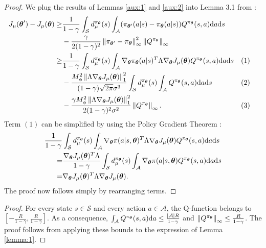 \firstlemma*
\begin{proof}
We plug the results of Lemmas \ref{aux:1} and \ref{aux:2} into Lemma 3.1 from \cite{NIPS2013_5186}:
\begin{align*}
J_{\mu}(\vtheta') - J_{\mu}(\vtheta) \geq  
	& \frac{1}{1-\gamma} \int_{\mathcal{S}}d_{\mu}^{\pi_{\vtheta}}(s)
	\int_{\mathcal{A}} (\pi_{\vtheta'}(a|s) - \pi_{\vtheta}(a|s))Q^{\pi_{\vtheta}}(s,a)\mathrm{d}a\mathrm{d}s \\
	& -\frac{\gamma}{2(1-\gamma)^2} \norm[\infty]{\pi_{\vtheta'}-\pi_{\vtheta}}^2 \norm[\infty]{Q^{\pi_{\vtheta}}} \\
	\geq & 
		\frac{1}{1-\gamma} \int_{\mathcal{S}}d_{\mu}^{\pi_{\vtheta}}(s)
		\int_{\mathcal{A}}
		\nabla_{\vtheta}\pi_{\vtheta}(a|s)^T\Lambda\gradJ{\vtheta}
		Q^{\pi_{\vtheta}}(s,a)\mathrm{d}a\mathrm{d}s && (1) \\
		& - \frac{M_{\phi}^2\norm[1]{\Lambda\gradJ{\vtheta}}^2}
		{(1-\gamma)\sqrt{2\pi}\sigma^3}
		\int_{\mathcal{S}}d_{\mu}^{\pi_{\vtheta}}(s)
		\int_{\mathcal{A}} 
		Q^{\pi_{\vtheta}}(s,a)\mathrm{d}a\mathrm{d}s && (2) \\ 
		&  -\frac{\gamma M_{\phi}^2\norm[1]{\Lambda\gradJ{\vtheta}}^2}
		{2(1-\gamma)^2\sigma^2}\norm[\infty]{Q^{\pi_{\vtheta}}}.	&& (3)
\end{align*}
Term $(1)$ can be simplified by using the Policy Gradient Theorem \cite{NIPS1999_1713}:
\begin{align*}
\frac{1}{1-\gamma} &  \int_{\mathcal{S}}d_{\mu}^{\pi_{\vtheta}}(s)
		\int_{\mathcal{A}}
		\nabla_{\vtheta}\pi(a|s,\vtheta)^T\Lambda\gradJ{\vtheta}
		Q^{\pi_{\vtheta}}(s,a)\mathrm{d}a\mathrm{d}s \\
		= & \frac{\gradJ{\vtheta}^T\Lambda}{1-\gamma}
		\int_{\mathcal{S}}d_{\mu}^{\pi_{\vtheta}}(s)
		\int_{\mathcal{A}}
		\nabla_{\vtheta}\pi(a|s,\vtheta)Q^{\pi_{\vtheta}}(s,a)\mathrm{d}a\mathrm{d}s \\
		= & \gradJ{\vtheta}^T\Lambda\gradJ{\vtheta}.
\end{align*}
The proof now follows simply by rearranging terms.
\end{proof}


\firsttheorem*
\begin{proof}
For every state $s \in \mathcal{S}$ and every action $a \in \mathcal{A}$, the Q-function belongs to $\left[-\frac{R}{1-\gamma},\frac{R}{1-\gamma}\right]$. As a consequence, $\int_{\mathcal{A}}Q^{\pi_{\vtheta}}(s,a)\mathrm{d}a \leq \frac{|\mathcal{A}|R}{1-\gamma}$ and $\norm[\infty]{Q^{\pi_{\vtheta}}} \leq \frac{R}{1-\gamma}$. The proof follows from applying these bounds to the expression of Lemma \ref{lemma:1}.
\end{proof}

